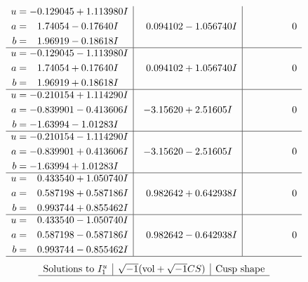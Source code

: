 \documentclass[1p]{elsarticle_modified}
\theoremstyle{definition}
\newcommand{\I}{\sqrt{-1}}
\begin{document}
$$\begin{array}{c|c|c}
\begin{aligned}
u &= -0.129045 + 1.113980 I \\
a &= \phantom{-}1.74054 - 0.17640 I \\
b &= \phantom{-}1.96919 - 0.18618 I\end{aligned}
 & \phantom{-}0.094102 - 1.056740 I & \phantom{-0.000000 } 0 \\ \hline\begin{aligned}
u &= -0.129045 - 1.113980 I \\
a &= \phantom{-}1.74054 + 0.17640 I \\
b &= \phantom{-}1.96919 + 0.18618 I\end{aligned}
 & \phantom{-}0.094102 + 1.056740 I & \phantom{-0.000000 } 0 \\ \hline\begin{aligned}
u &= -0.210154 + 1.114290 I \\
a &= -0.839901 - 0.413606 I \\
b &= -1.63994 - 1.01283 I\end{aligned}
 & -3.15620 + 2.51605 I & \phantom{-0.000000 } 0 \\ \hline\begin{aligned}
u &= -0.210154 - 1.114290 I \\
a &= -0.839901 + 0.413606 I \\
b &= -1.63994 + 1.01283 I\end{aligned}
 & -3.15620 - 2.51605 I & \phantom{-0.000000 } 0 \\ \hline\begin{aligned}
u &= \phantom{-}0.433540 + 1.050740 I \\
a &= \phantom{-}0.587198 + 0.587186 I \\
b &= \phantom{-}0.993744 + 0.855462 I\end{aligned}
 & \phantom{-}0.982642 + 0.642938 I & \phantom{-0.000000 } 0 \\ \hline\begin{aligned}
u &= \phantom{-}0.433540 - 1.050740 I \\
a &= \phantom{-}0.587198 - 0.587186 I \\
b &= \phantom{-}0.993744 - 0.855462 I\end{aligned}
 & \phantom{-}0.982642 - 0.642938 I & \phantom{-0.000000 } 0\\
 \hline 
 \end{array}$$\newpage$$\begin{array}{c|c|c}  
\text{Solutions to }I^u_{1}& \I (\text{vol} + \sqrt{-1}CS) & \text{Cusp shape}\\
 \hline 

\end{array}$$
\end{document}
